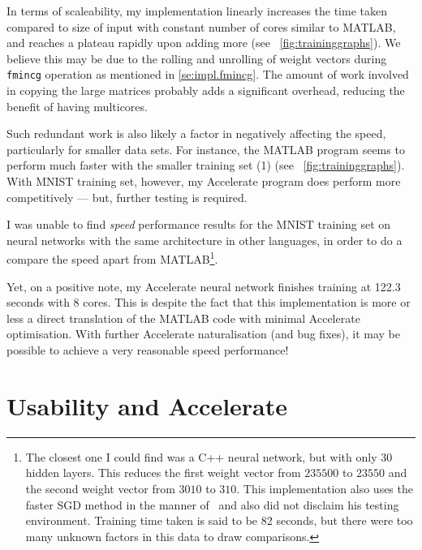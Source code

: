 
In terms of scaleability, my implementation linearly increases the time taken compared to size of input with constant number of cores similar to MATLAB, and reaches a plateau rapidly upon adding more (see ~\ref{fig:traininggraphs}). We believe this may be due to the rolling and unrolling of weight vectors during \texttt{fmincg} operation as mentioned in \ref{se:impl.fmincg}. The amount of work involved in copying the large matrices probably adds a significant overhead, reducing the benefit of having multicores.

Such redundant work is also likely a factor in negatively affecting the speed, particularly for smaller data sets. For instance, the MATLAB program seems to perform much faster with the smaller training set (1) (see ~\ref{fig:traininggraphs}). With MNIST training set, however, my Accelerate program does perform more competitively --- but, further testing is required. 

I was unable to find \textit{speed} performance results for the MNIST training set on neural networks with the same architecture in other languages, in order to do a compare the speed apart from MATLAB\footnote{The closest one I could find was a C++ neural network\cite{Wol17}, but with only 30 hidden layers. This reduces the first weight vector from $235500$ to $23550$ and the second weight vector from $3010$ to $310$. This implementation also uses the faster SGD method in the manner of~\cite{LeC98} and also did not disclaim his testing environment. Training time taken is said to be 82 seconds, but there were too many unknown factors in this data to draw comparisons.}.

Yet, on a positive note, my Accelerate neural network finishes training at 122.3 seconds with 8 cores. This is despite the fact that this implementation is more or less a direct translation of the MATLAB code with minimal Accelerate optimisation. With further Accelerate naturalisation (and bug fixes), it may be possible to achieve a very reasonable speed performance!

\section{Usability and Accelerate} \label{se:eval.usability}

